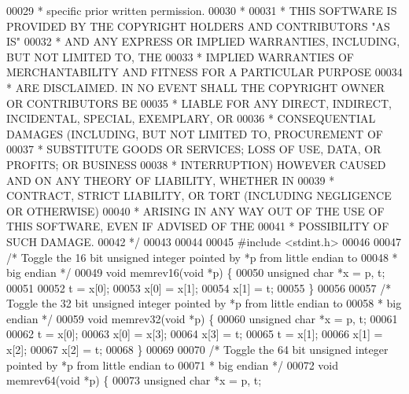 \begin{DoxyCode}
00029 \textcolor{comment}{ *     specific prior written permission.}
00030 \textcolor{comment}{ *}
00031 \textcolor{comment}{ * THIS SOFTWARE IS PROVIDED BY THE COPYRIGHT HOLDERS AND CONTRIBUTORS "AS IS"}
00032 \textcolor{comment}{ * AND ANY EXPRESS OR IMPLIED WARRANTIES, INCLUDING, BUT NOT LIMITED TO, THE}
00033 \textcolor{comment}{ * IMPLIED WARRANTIES OF MERCHANTABILITY AND FITNESS FOR A PARTICULAR PURPOSE}
00034 \textcolor{comment}{ * ARE DISCLAIMED. IN NO EVENT SHALL THE COPYRIGHT OWNER OR CONTRIBUTORS BE}
00035 \textcolor{comment}{ * LIABLE FOR ANY DIRECT, INDIRECT, INCIDENTAL, SPECIAL, EXEMPLARY, OR}
00036 \textcolor{comment}{ * CONSEQUENTIAL DAMAGES (INCLUDING, BUT NOT LIMITED TO, PROCUREMENT OF}
00037 \textcolor{comment}{ * SUBSTITUTE GOODS OR SERVICES; LOSS OF USE, DATA, OR PROFITS; OR BUSINESS}
00038 \textcolor{comment}{ * INTERRUPTION) HOWEVER CAUSED AND ON ANY THEORY OF LIABILITY, WHETHER IN}
00039 \textcolor{comment}{ * CONTRACT, STRICT LIABILITY, OR TORT (INCLUDING NEGLIGENCE OR OTHERWISE)}
00040 \textcolor{comment}{ * ARISING IN ANY WAY OUT OF THE USE OF THIS SOFTWARE, EVEN IF ADVISED OF THE}
00041 \textcolor{comment}{ * POSSIBILITY OF SUCH DAMAGE.}
00042 \textcolor{comment}{ */}
00043 
00044 
00045 \textcolor{preprocessor}{#}\textcolor{preprocessor}{include} \textcolor{preprocessor}{<}\textcolor{preprocessor}{stdint}\textcolor{preprocessor}{.}\textcolor{preprocessor}{h}\textcolor{preprocessor}{>}
00046 
00047 \textcolor{comment}{/* Toggle the 16 bit unsigned integer pointed by *p from little endian to}
00048 \textcolor{comment}{ * big endian */}
00049 \textcolor{keywordtype}{void} memrev16(\textcolor{keywordtype}{void} *p) \{
00050     \textcolor{keywordtype}{unsigned} \textcolor{keywordtype}{char} *x = p, t;
00051 
00052     t = x[0];
00053     x[0] = x[1];
00054     x[1] = t;
00055 \}
00056 
00057 \textcolor{comment}{/* Toggle the 32 bit unsigned integer pointed by *p from little endian to}
00058 \textcolor{comment}{ * big endian */}
00059 \textcolor{keywordtype}{void} memrev32(\textcolor{keywordtype}{void} *p) \{
00060     \textcolor{keywordtype}{unsigned} \textcolor{keywordtype}{char} *x = p, t;
00061 
00062     t = x[0];
00063     x[0] = x[3];
00064     x[3] = t;
00065     t = x[1];
00066     x[1] = x[2];
00067     x[2] = t;
00068 \}
00069 
00070 \textcolor{comment}{/* Toggle the 64 bit unsigned integer pointed by *p from little endian to}
00071 \textcolor{comment}{ * big endian */}
00072 \textcolor{keywordtype}{void} memrev64(\textcolor{keywordtype}{void} *p) \{
00073     \textcolor{keywordtype}{unsigned} \textcolor{keywordtype}{char} *x = p, t;

\end{DoxyCode}
